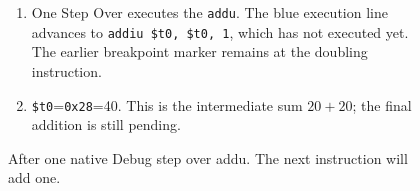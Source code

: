 \begin{figure}[htbp]
  \par\smallskip
  \begin{minipage}{\linewidth}
    \small
    \begin{enumerate}
      \item One Step Over executes the \texttt{addu}. The blue execution line advances to \texttt{addiu \$t0, \$t0, 1}, which has not executed yet. The earlier breakpoint marker remains at the doubling instruction.
      \item \texttt{\$t0}=\texttt{0x28}=40. This is the intermediate sum $20+20$; the final addition is still pending.
    \end{enumerate}
  \end{minipage}
  \caption{After one native Debug step over addu. The next instruction will add one.}
  \label{capture:001-console-calculation-f04-after-add}
\end{figure}
